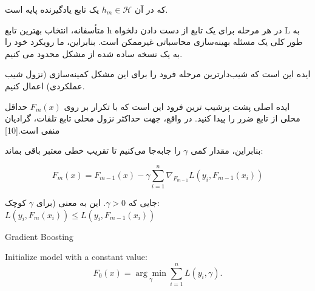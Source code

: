 \documentclass[12pt,a4paper,BCOR=.7cm,headsepline,bibliography=totoc]{report}
\begin{document}
که در آن ${\displaystyle h_{m}\in {\mathcal {H}}}$ یک تابع یادگیرنده پایه است.

متأسفانه، انتخاب بهترین تابع h در هر مرحله برای یک تابع از دست دادن دلخواه L به طور کلی یک مسئله بهینه‌سازی محاسباتی غیرممکن است. بنابراین، ما رویکرد خود را به یک نسخه ساده شده از مشکل محدود می کنیم.

ایده این است که شیب‌دارترین مرحله فرود را برای این مشکل کمینه‌سازی (نزول شیب عملکردی) اعمال کنیم.

ایده اصلی پشت پرشیب ترین فرود این است که با تکرار بر روی ${\displaystyle F_{m}(x)}$ حداقل محلی از تابع ضرر را پیدا کنید. در واقع، جهت حداکثر نزول محلی تابع تلفات، گرادیان منفی است.[10]

بنابراین، مقدار کمی ${\displaystyle \gamma }$ را جابه‌جا می‌کنیم تا تقریب خطی معتبر باقی بماند:

$${\displaystyle F_{m}(x)=F_{m-1}(x)-\gamma \sum _{i=1}^{n}{\nabla _{F_{m-1}}L(y_ {i},F_{m-1}(x_{i}))}}$$


جایی که ${\displaystyle \gamma >0}$. این به معنی (برای ${\displaystyle \gamma }$ کوچک: ${\displaystyle L(y_{i},F_{m}(x_{i}))\leq L(y_{i},F_{m-1} (x_{i}))}$
\begin{latin}
\begin{algorithm}
\caption{Gradient Boosting}\label{alg:two}
Initialize model with a constant value:\\
$${\displaystyle F_{0}(x)={\underset {\gamma }{\arg \min }}\sum _{i=1}^{n}L(y_{i},\gamma ).}$$
\end{algorithm}
\end{latin}
\end{document}
